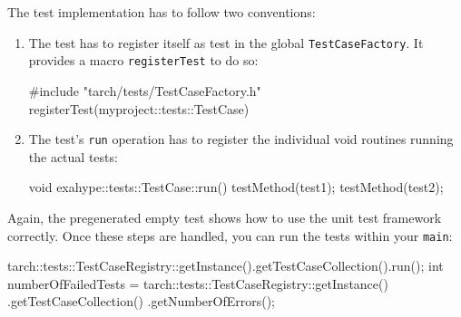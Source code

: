 The test implementation has to follow two conventions:
\begin{enumerate}
  \item The test has to register itself as test in the global
  \texttt{TestCaseFactory}. It provides a macro \texttt{registerTest} to do so:
    \begin{code}
#include "tarch/tests/TestCaseFactory.h"
registerTest(myproject::tests::TestCase)
    \end{code}
  \item The test's \texttt{run} operation has to register the individual void
  routines running the actual tests:
  \begin{code}
void exahype::tests::TestCase::run() {
  testMethod(test1);
  testMethod(test2);
}
  \end{code}
\end{enumerate}

\noindent
Again, the pregenerated empty test shows how to use the unit test framework
correctly.
Once these steps are handled, you can run the tests within your \texttt{main}:

\begin{code}
tarch::tests::TestCaseRegistry::getInstance().getTestCaseCollection().run();
int numberOfFailedTests = tarch::tests::TestCaseRegistry::getInstance()
                         .getTestCaseCollection()
                         .getNumberOfErrors();
\end{code}

